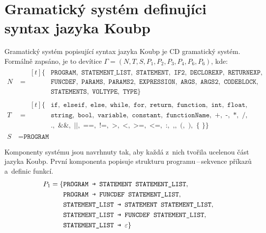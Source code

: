 \section{Gramatický systém definujíci syntax jazyka Koubp}\label{kap_cdgs_koubp}
Gramatický systém popisující syntax jazyka Koubp je CD gramatický systém.
Formálně zapsáno, je to devítice $\Gamma = (N, T, S, P_1, P_2, P_3, P_4, P_6, P_6)$, kde:
\begin{align*}
    N & = 
        \begin{aligned}[t]
          \{&\texttt{PROGRAM}, \texttt{ STATEMENT\_LIST}, \texttt{ STATEMENT}, \texttt{ IF2}, \texttt{ DECLOREXP}, \texttt{ RETURNEXP},\\
            &\texttt{FUNCDEF}, \texttt{ PARAMS}, \texttt{ PARAMS2}, \texttt{ EXPRESSION}, \texttt{ ARGS}, \texttt{ ARGS2}, \texttt{ CODEBLOCK},\\
            &\texttt{STATEMENTS}, \texttt{ VOLTYPE}, \texttt{ TYPE}\}
        \end{aligned}\\
    T & = 
        \begin{aligned}[t]
          \{&\texttt{if}, \texttt{ elseif}, \texttt{ else}, \texttt{ while}, \texttt{ for}, \texttt{ return}, \texttt{ function}, \texttt{ int}, \texttt{ float},\\
            &\texttt{string}, \texttt{ bool}, \texttt{ variable}, \texttt{ constant}, \texttt{ functionName}, \texttt{ +}, \texttt{ -}, \texttt{ *}, \texttt{ /},\\
            &\texttt{.}, \texttt{ \&\&}, \texttt{ ||}, \texttt{ ==}, \texttt{ !=}, \texttt{ >}, \texttt{ <}, \texttt{ >=}, \texttt{ <=}, \texttt{ :}, \texttt{ ,}, \texttt{ (}, \texttt{ )}, \texttt{ \{} \texttt{ \}}\}
        \end{aligned}\\
    S & = \texttt{PROGRAM}
\end{align*}



Komponenty systému jsou navrhnuty tak, aby každá z~nich tvořila ucelenou část jazyka Koubp.
První komponenta popisuje strukturu programu\,--\,sekvence příkazů a~definic funkcí.
\begin{equation*}
    P_1 = \{ 
        \begin{aligned}[t] 
            &\texttt{PROGRAM \textrightarrow{} STATEMENT STATEMENT\textunderscore LIST},\\
            &\texttt{PROGRAM \textrightarrow{} FUNCDEF STATEMENT\textunderscore LIST},\\
            &\texttt{STATEMENT\textunderscore LIST \textrightarrow{} STATEMENT STATEMENT\textunderscore LIST},\\
            &\texttt{STATEMENT\textunderscore LIST \textrightarrow{} FUNCDEF STATEMENT\textunderscore LIST},\\
            &\texttt{STATEMENT\textunderscore LIST \textrightarrow{} }\varepsilon\}
        \end{aligned}
\end{equation*}


